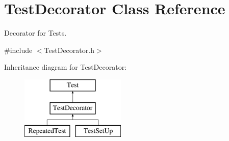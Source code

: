 \hypertarget{class_test_decorator}{}\section{Test\+Decorator Class Reference}
\label{class_test_decorator}


Decorator for Tests.  




{\ttfamily \#include $<$Test\+Decorator.\+h$>$}

Inheritance diagram for Test\+Decorator\+:\begin{figure}[H]
\begin{center}
\leavevmode
\includegraphics[height=3.000000cm]{class_test_decorator}
\end{center}
\end{figure}
